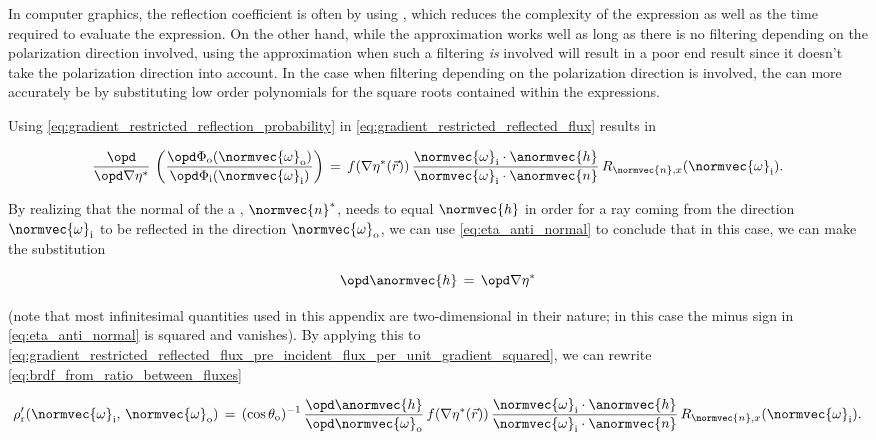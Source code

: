 {In computer graphics, the reflection coefficient is often \approximated by using , which reduces the complexity of the expression as well as the time required to evaluate the expression. On the other hand, while the approximation works well as long as there is no filtering depending on the polarization direction involved, using the approximation when such a filtering \emph{is} involved will result in a poor end result since it doesn't take the polarization direction into account. In the case when filtering depending on the polarization direction is involved, the  can more accurately be \approximated by substituting low order polynomials for the square roots contained within the expressions.

Using \eqref{eq:gradient_restricted_reflection_probability} in \eqref{eq:gradient_restricted_reflected_flux} results in

\begin{equation} \label{eq:gradient_restricted_reflected_flux_pre_incident_flux_per_unit_gradient_squared}
\frac{\opd}{\opd \nabla\eta^*}\,\left(\frac{\opd \Phi_{\text{o}}(\normvec{\omega}_{\text{o}})}{\opd \Phi_{\text{i}}(\normvec{\omega}_{\text{i}})}\right) \,=\, f(\nabla\eta^*(\vec{r}))\,\frac{\normvec{\omega}_{\text{i}}\cdot\anormvec{h}}{\normvec{\omega}_{\text{i}}\cdot\anormvec{n}}\,R_{\normvec{n},x}(\normvec{\omega}_{\text{i}}).
\end{equation}

By realizing that the normal of the a \microfacet, $\normvec{n}^*$, needs to equal $\normvec{h}$ in order for a ray coming from the direction $\normvec{\omega}_{\text{i}}$ to be reflected in the direction $\normvec{\omega}_{\text{o}}$, we can use \eqref{eq:eta_anti_normal} to conclude that in this case, we can make the substitution

\begin{equation}
\opd \anormvec{h} \,=\, \opd\nabla\eta^*
\end{equation}

(note that most infinitesimal quantities used in this appendix are two-dimensional in their nature; in this case the minus sign in \eqref{eq:eta_anti_normal} is squared and vanishes). By applying this to \eqref{eq:gradient_restricted_reflected_flux_pre_incident_flux_per_unit_gradient_squared}, we can rewrite  \eqref{eq:brdf_from_ratio_between_fluxes}

\begin{equation}
\rho'_{\text{r}}(\normvec{\omega}_{\text{i}},\, \normvec{\omega}_{\text{o}}) \,=\, (\cos\theta_{\text{o}})^{-1}\, \frac{\opd\anormvec{h}}{\opd\normvec{\omega}_{\text{o}}}\,f(\nabla\eta^*(\vec{r}))\,\frac{\normvec{\omega}_{\text{i}}\cdot\anormvec{h}}{\normvec{\omega}_{\text{i}}\cdot\anormvec{n}}\,R_{\normvec{n},x}(\normvec{\omega}_{\text{i}}).
\end{equation}

}

